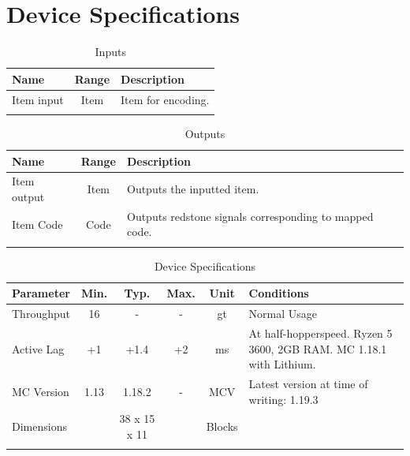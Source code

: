 \documentclass[10pt]{datasheet}
\begin{document}
\section{Device Specifications}

\begin{table}[h]
    \caption{Inputs}
    \begin{tabularx}{\textwidth}{l | c | X}
        \thickhline
        \textbf{Name} & \textbf{Range} & \textbf{Description} \\
        \hline
        Item input & Item & Item for encoding. \\
        \thickhline
\end{tabularx}
\end{table}

\begin{table}[h]
    \caption{Outputs}
    \begin{tabularx}{\textwidth}{l | c | X}
        \thickhline
        \textbf{Name} & \textbf{Range} & \textbf{Description} \\
        \hline
        Item output & Item & Outputs the inputted item. \\
        \hline
        Item Code & Code & Outputs redstone signals corresponding to mapped code. \\
        \thickhline
\end{tabularx}
\end{table}

\begin{table}[h]
    \caption{Device Specifications}
    \begin{tabularx}{\textwidth}{l | c c c | c | X}
        \thickhline
        \textbf{Parameter} & \textbf{Min.} & \textbf{Typ.} & \textbf{Max.} &
        \textbf{Unit} & \textbf{Conditions} \\
        \hline
        Throughput  & 16 & - & - & gt & Normal Usage \\
        \hline
        Active Lag & +1 & +1.4 & +2 & ms & At half-hopperspeed. Ryzen 5 3600, 2GB RAM. MC 1.18.1 with Lithium. \\
        \hline
        MC Version & 1.13 & 1.18.2 & - & MCV & Latest version at time of writing: 1.19.3\\
        \hline
        Dimensions & & 38 x 15 x 11 & & Blocks & \\
        \thickhline
\end{tabularx}
\end{table}
\newpage
\end{document}
